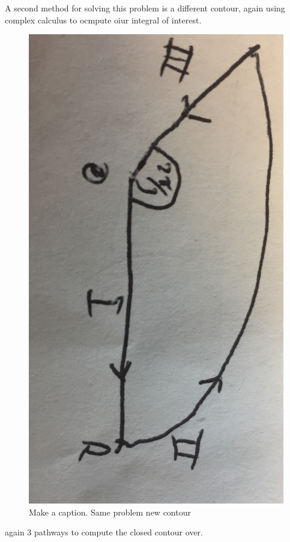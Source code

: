 \documentclass{article}
\begin{document}
A second method for solving this problem is a different contour, again using complex calculus to ocmpute oiur integral of interest. 
\begin{figure}[H]
  \centering
    \includegraphics[scale=0.2]{Figures/again.png}
    \caption{Make a caption. Same problem new contour}
\end{figure}
again 3 pathways to compute the closed contour over. 
\end{document}
